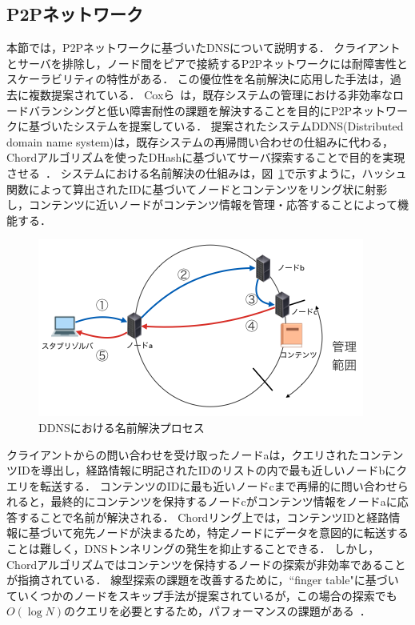 \subsection{P2Pネットワーク}
本節では，P2Pネットワークに基づいたDNSについて説明する．
クライアントとサーバを排除し，ノード間をピアで接続するP2Pネットワークには耐障害性とスケーラビリティの特性がある．
この優位性を名前解決に応用した手法は，過去に複数提案されている．
Coxら~\cite{cox}は，既存システムの管理における非効率なロードバランシングと低い障害耐性の課題を解決することを目的にP2Pネットワークに基づいたシステムを提案している．
提案されたシステムDDNS(Distributed domain name system)は，既存システムの再帰問い合わせの仕組みに代わる，Chordアルゴリズムを使ったDHashに基づいてサーバ探索することで目的を実現させる~\cite{dhash}．
システムにおける名前解決の仕組みは，図~\ref{fig:chord}で示すように，ハッシュ関数によって算出されたIDに基づいてノードとコンテンツをリング状に射影し，コンテンツに近いノードがコンテンツ情報を管理・応答することによって機能する．
\begin{figure}[bhtp]
 \centering
 \includegraphics[scale=0.6]{figure/chord-mechanism.png}
 \caption{DDNSにおける名前解決プロセス}
 \label{fig:chord}
\end{figure}
クライアントからの問い合わせを受け取ったノードaは，クエリされたコンテンツIDを導出し，経路情報に明記されたIDのリストの内で最も近しいノードbにクエリを転送する．
コンテンツのIDに最も近いノードcまで再帰的に問い合わせられると，最終的にコンテンツを保持するノードcがコンテンツ情報をノードaに応答することで名前が解決される．
Chordリング上では，コンテンツIDと経路情報に基づいて宛先ノードが決まるため，特定ノードにデータを意図的に転送することは難しく，DNSトンネリングの発生を抑止することできる．
しかし，Chordアルゴリズムではコンテンツを保持するノードの探索が非効率であることが指摘されている．
線型探索の課題を改善するために，``finger table"に基づいていくつかのノードをスキップ手法が提案されているが，この場合の探索でも$O(\log N)$のクエリを必要とするため，パフォーマンスの課題がある~\cite{p_donas}．

